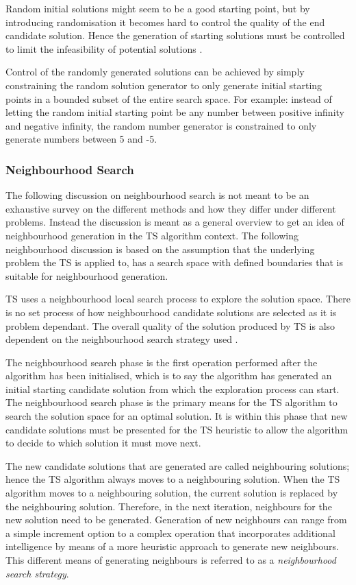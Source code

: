 Random initial solutions might seem to be a good starting point, but by introducing randomisation it becomes hard to control the quality of the end candidate solution\cite{TSHazardous}. Hence the generation of starting solutions must be controlled to limit the infeasibility of potential solutions \cite{TSHazardous}. 

Control of the randomly generated solutions can be achieved by simply constraining the random solution generator to only generate initial starting points in a bounded subset of the entire search space. For example: instead of letting the random initial starting point be any number between positive infinity and negative infinity, the random number generator is constrained to only generate numbers between 5 and -5.

\subsubsection{Neighbourhood Search}
The following discussion on neighbourhood search is not meant to be an exhaustive survey on the different methods and how they differ under different problems. Instead the discussion is meant as a general overview to get an idea of neighbourhood generation in the \gls{TS} algorithm context. The following neighbourhood discussion is based on the assumption that the underlying problem the \gls{TS} is applied to, has a search space with defined boundaries that is suitable for neighbourhood generation.

TS uses a neighbourhood local search process to explore the solution space. There is no set process of how neighbourhood candidate solutions are selected as it is problem dependant. The overall quality of the solution produced by \gls{TS} is also dependent on the neighbourhood search strategy used \cite{TSHazardous}. 

The neighbourhood search phase is the first operation performed after the algorithm has been initialised, which is to say the algorithm has generated an initial starting candidate solution from which the exploration process can start. The neighbourhood search phase is the primary means for the \gls{TS} algorithm to search the solution space for an optimal solution. It is within this phase that new candidate solutions must be presented for the \gls{TS} heuristic to allow the algorithm to decide to which solution it must move next.

The new candidate solutions that are generated are called neighbouring solutions; hence the \gls{TS} algorithm always moves to a neighbouring solution. When the \gls{TS} algorithm moves to a neighbouring solution, the current solution is replaced by the neighbouring solution. Therefore, in the next iteration, neighbours for the new solution need to be generated. Generation of new neighbours can range from a simple increment option to a complex operation that incorporates additional intelligence by means of a more heuristic approach to generate new neighbours. This different means of generating neighbours is referred to as a \emph{neighbourhood search strategy}.

